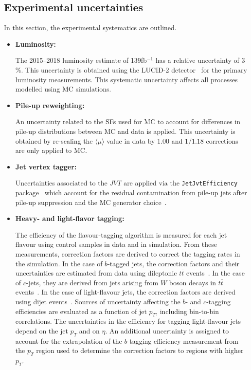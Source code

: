 \subsection{Experimental uncertainties}
\label{subsec:syst_exp}

In this section, the experimental systematics are outlined.

\begin{itemize}
\item \textbf{Luminosity:}

The 2015--2018 luminosity estimate of 139fb$^{-1}$ has a relative uncertainty of 3$\%$. This uncertainty is obtained using
the LUCID-2 detector~\cite{Avoni:2018} for the primary luminosity measurements. This systematic uncertainty affects all processes modelled using MC simulations.


\item \textbf{Pile-up reweighting:}

An uncertainty related to the SFs used for MC to account for differences in pile-up distributions between MC and data is applied.
This uncertainty is obtained by re-scaling the $\langle \mu \rangle$ value in data by \num{1.00} and $1/1.18$ corrections are only applied to MC.


\item \textbf{Jet vertex tagger:}

Uncertainties associated to the $JVT$ are applied via the \texttt{JetJvtEfficiency} package~\cite{twiki-JVT} which account for the
residual contamination from pile-up jets after pile-up suppression and the MC generator choice~\cite{PERF-2016-06}.


\item \textbf{Heavy- and light-flavor tagging:}

The efficiency of the flavour-tagging algorithm is measured for each jet flavour using control samples in data and in simulation. From these
measurements, correction factors are derived to correct the tagging rates in the simulation. In the case of $b$-tagged jets, the correction factors and
their uncertainties are estimated from data using dileptonic $t\bar{t}$ events~\cite{PERF-2016-05,FTAG-2018-01}. In the case of $c$-jets, they are derived from
jets arising from $W$ boson decays in $t\bar{t}$ events~\cite{ATLAS-CONF-2018-001}. In the case of light-flavour jets, the correction factors are derived
using dijet events~\cite{ATLAS-CONF-2018-006}. Sources of uncertainty affecting the $b$- and $c$-tagging efficiencies are evaluated as a function of
jet $p_{T}$, including bin-to-bin correlations. The uncertainties in the efficiency for tagging light-flavour jets depend on the jet $p_{T}$ and on $\eta$.
An additional uncertainty is assigned to account for the extrapolation of the $b$-tagging efficiency measurement from the $p_{T}$ region used
to determine the correction factors to regions with higher $p_{T}$.



\end{itemize}
